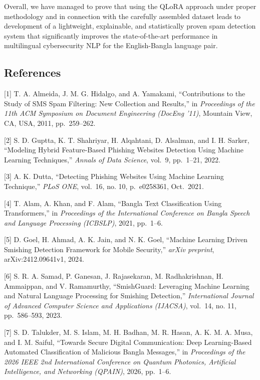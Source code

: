 Overall, we have managed to prove that using the QLoRA approach under
proper methodology and in connection with the carefully assembled
dataset leads to development of a lightweight, explainable, and
statistically proven spam detection system that significantly improves
the state-of-the-art performance in multilingual cybersecurity NLP for
the English-Bangla language pair.

\subsection{References}\label{references}

{[}1{]} T. A. Almeida, J. M. G. Hidalgo, and A. Yamakami,
``Contributions to the Study of SMS Spam Filtering: New Collection and
Results,'' in \emph{Proceedings of the 11th ACM Symposium on Document
Engineering (DocEng '11)}, Mountain View, CA, USA, 2011, pp.~259--262.

{[}2{]} S. D. Guptta, K. T. Shahriyar, H. Alqahtani, D. Alsalman, and I.
H. Sarker, ``Modeling Hybrid Feature-Based Phishing Websites Detection
Using Machine Learning Techniques,'' \emph{Annals of Data Science},
vol.~9, pp.~1--21, 2022.

{[}3{]} A. K. Dutta, ``Detecting Phishing Websites Using Machine
Learning Technique,'' \emph{PLoS ONE}, vol.~16, no. 10, p.~e0258361,
Oct.~2021.

{[}4{]} T. Alam, A. Khan, and F. Alam, ``Bangla Text Classification
Using Transformers,'' in \emph{Proceedings of the International
Conference on Bangla Speech and Language Processing (ICBSLP)}, 2021,
pp.~1--6.

{[}5{]} D. Goel, H. Ahmad, A. K. Jain, and N. K. Goel, ``Machine
Learning Driven Smishing Detection Framework for Mobile Security,''
\emph{arXiv preprint}, arXiv:2412.09641v1, 2024.

{[}6{]} S. R. A. Samad, P. Ganesan, J. Rajasekaran, M. Radhakrishnan, H.
Ammaippan, and V. Ramamurthy, ``SmishGuard: Leveraging Machine Learning
and Natural Language Processing for Smishing Detection,''
\emph{International Journal of Advanced Computer Science and
Applications (IJACSA)}, vol.~14, no. 11, pp.~586--593, 2023.

{[}7{]} S. D. Talukder, M. S. Islam, M. H. Badhan, M. R. Hasan, A. K. M.
A. Musa, and I. M. Saiful, ``Towards Secure Digital Communication: Deep
Learning-Based Automated Classification of Malicious Bangla Messages,''
in \emph{Proceedings of the 2026 IEEE 2nd International Conference on
Quantum Photonics, Artificial Intelligence, and Networking (QPAIN)},
2026, pp.~1--6.

